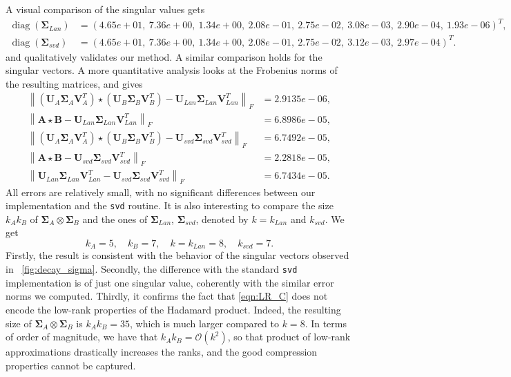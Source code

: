 \documentclass[10pt,titlepage]{article}
\numberwithin{equation}{section}
\numberwithin{figure}{section}
\newcommand{\norm}[1]{\left\lVert#1\right\rVert}
\newcommand{\hadamard}[2]{\mathbf{#1} \star \mathbf{#2}}
\DeclareMathOperator{\diag}{diag}
\newcommand{\figref}[1]{\figurename~\ref{#1}}
\begin{document}
A visual comparison of the singular values gets
\begin{align}
	\diag(\mathbf{\Sigma}_{Lan})&=(4.65e+01, \  7.36e+00, \  1.34e+00, \  2.08e-01, \  2.75e-02, \  3.08e-03, \  2.90e-04, \  1.93e-06)^T, \\
	\diag(\mathbf{\Sigma}_{svd})&=(4.65e+01, \  7.36e+00, \  1.34e+00, \  2.08e-01, \  2.75e-02, \  3.12e-03, \    2.97e-04)^T.
\end{align}
and qualitatively validates our method. A similar comparison holds for the singular vectors. A more quantitative analysis looks at the Frobenius norms of the resulting matrices, and gives
\begin{align}
	\norm{(\mathbf{U}_A\mathbf{\Sigma}_A\mathbf{V}_A^T)\star(\mathbf{U}_B\mathbf{\Sigma}_B\mathbf{V}_B^T)-\mathbf{U}_{Lan}\mathbf{\Sigma}_{Lan}\mathbf{V}_{Lan}^T}_F&=2.9135e-06, \\
	\norm{\hadamard{A}{B}-\mathbf{U}_{Lan}\mathbf{\Sigma}_{Lan}\mathbf{V}_{Lan}^T}_F&=6.8986e-05, \\
	\norm{(\mathbf{U}_A\mathbf{\Sigma}_A\mathbf{V}_A^T)\star(\mathbf{U}_B\mathbf{\Sigma}_B\mathbf{V}_B^T)-\mathbf{U}_{svd}\mathbf{\Sigma}_{svd}\mathbf{V}_{svd}^T}_F&=6.7492e-05, \\
	\norm{\hadamard{A}{B}-\mathbf{U}_{svd}\mathbf{\Sigma}_{svd}\mathbf{V}_{svd}^T}_F&=2.2818e-05, \\
	\norm{\mathbf{U}_{Lan}\mathbf{\Sigma}_{Lan}\mathbf{V}_{Lan}^T-\mathbf{U}_{svd}\mathbf{\Sigma}_{svd}\mathbf{V}_{svd}^T}_F&=6.7434e-05.
\end{align}
All errors are relatively small, with no significant differences between our implementation and the \texttt{svd} routine. It is also interesting to compare the size $k_A k_B$ of $\mathbf{\Sigma}_A \otimes \mathbf{\Sigma}_B $ and the ones of $\mathbf{\Sigma}_{Lan}$, $\mathbf{\Sigma}_{svd}$, denoted by $k=k_{Lan}$ and $k_{svd}$. We get 
\begin{equation}
	k_A=5, \quad k_B=7, \quad k=k_{Lan}=8, \quad k_{svd}=7.
\end{equation}
Firstly, the result is consistent with the behavior of the singular vectors observed in \figref{fig:decay_sigma}. Secondly, the difference with the standard \texttt{svd} implementation is of just one singular value, coherently with the similar error norms we computed. Thirdly, it confirms the fact that \eqref{eqn:LR_C} does not encode the low-rank properties of the Hadamard product. Indeed, the resulting size of $\mathbf{\Sigma}_A \otimes \mathbf{\Sigma}_B$ is $k_Ak_B=35$, which is much larger compared to $k=8$. In terms of order of magnitude, we have that $k_Ak_B=\mathcal{O}(k^2)$, so that product of low-rank approximations drastically increases the ranks, and the good compression properties cannot be captured. \\
\end{document}
